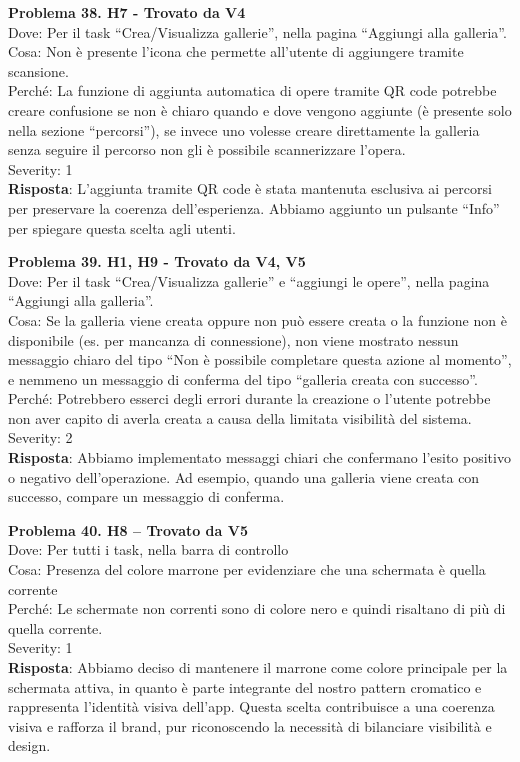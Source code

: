 \documentclass{article}
\begin{document}
\noindent \textbf{Problema 38. H7 - Trovato da V4} \\
Dove: Per il task “Crea/Visualizza gallerie”, nella pagina “Aggiungi alla galleria”. \\
Cosa: Non è presente l’icona che permette all’utente di aggiungere tramite scansione. \\
Perché: La funzione di aggiunta automatica di opere tramite QR code potrebbe creare confusione se non è chiaro quando e dove vengono aggiunte (è presente solo nella sezione “percorsi”), se invece uno volesse creare direttamente la galleria senza seguire il percorso non gli è possibile scannerizzare l’opera. \\
Severity: 1 \\
\textbf{Risposta}: L’aggiunta tramite QR code è stata mantenuta esclusiva ai percorsi per preservare la coerenza dell’esperienza. Abbiamo aggiunto un pulsante “Info” per spiegare questa scelta agli utenti.

\noindent \textbf{Problema 39. H1, H9 - Trovato da V4, V5} \\
Dove: Per il task “Crea/Visualizza gallerie” e “aggiungi le opere”, nella pagina “Aggiungi alla galleria”. \\
Cosa: Se la galleria viene creata oppure non può essere creata o la funzione non è disponibile (es. per mancanza di connessione), non viene mostrato nessun messaggio chiaro del tipo “Non è possibile completare questa azione al momento”, e nemmeno un messaggio di conferma del tipo “galleria creata con successo”. \\
Perché: Potrebbero esserci degli errori durante la creazione o l’utente potrebbe non aver capito di averla creata a causa della limitata visibilità del sistema. \\
Severity: 2 \\
\textbf{Risposta}: Abbiamo implementato messaggi chiari che confermano l’esito positivo o negativo dell’operazione. Ad esempio, quando una galleria viene creata con successo, compare un messaggio di conferma.

\noindent \textbf{Problema 40. H8 – Trovato da V5} \\
Dove: Per tutti i task, nella barra di controllo \\
Cosa: Presenza del colore marrone per evidenziare che una schermata è quella corrente \\
Perché: Le schermate non correnti sono di colore nero e quindi risaltano di più di quella corrente. \\
Severity: 1 \\
\textbf{Risposta}: Abbiamo deciso di mantenere il marrone come colore principale per la schermata attiva, in quanto è parte integrante del nostro pattern cromatico e rappresenta l’identità visiva dell’app. Questa scelta contribuisce a una coerenza visiva e rafforza il brand, pur riconoscendo la necessità di bilanciare visibilità e design.
\end{document}
